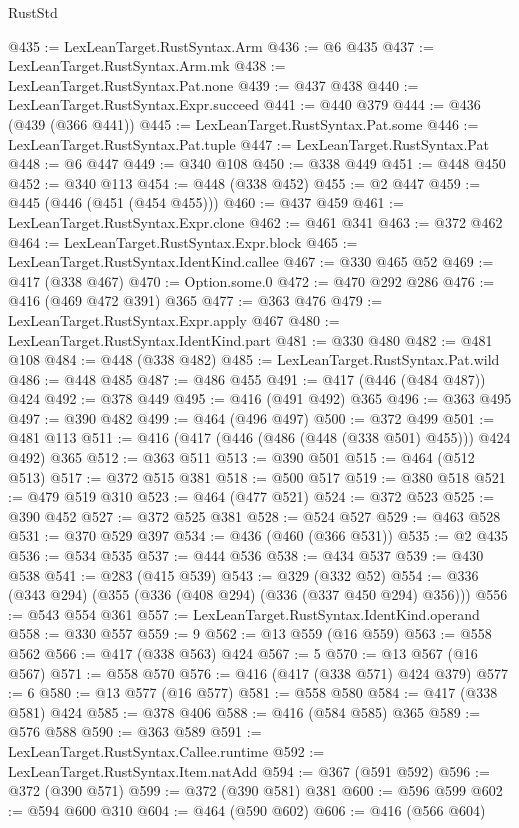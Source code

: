 \begin{lexlean}{RustStd}
\begin{coremodule}
@435 := LexLeanTarget.RustSyntax.Arm
@436 := @6 @435
@437 := LexLeanTarget.RustSyntax.Arm.mk
@438 := LexLeanTarget.RustSyntax.Pat.none
@439 := @437 @438
@440 := LexLeanTarget.RustSyntax.Expr.succeed
@441 := @440 @379
@444 := @436 (@439 (@366 @441))
@445 := LexLeanTarget.RustSyntax.Pat.some
@446 := LexLeanTarget.RustSyntax.Pat.tuple
@447 := LexLeanTarget.RustSyntax.Pat
@448 := @6 @447
@449 := @340 @108
@450 := @338 @449
@451 := @448 @450
@452 := @340 @113
@454 := @448 (@338 @452)
@455 := @2 @447
@459 := @445 (@446 (@451 (@454 @455)))
@460 := @437 @459
@461 := LexLeanTarget.RustSyntax.Expr.clone
@462 := @461 @341
@463 := @372 @462
@464 := LexLeanTarget.RustSyntax.Expr.block
@465 := LexLeanTarget.RustSyntax.IdentKind.callee
@467 := @330 @465 @52
@469 := @417 (@338 @467)
@470 := Option.some.{0}
@472 := @470 @292 @286
@476 := @416 (@469 @472 @391) @365
@477 := @363 @476
@479 := LexLeanTarget.RustSyntax.Expr.apply @467
@480 := LexLeanTarget.RustSyntax.IdentKind.part
@481 := @330 @480
@482 := @481 @108
@484 := @448 (@338 @482)
@485 := LexLeanTarget.RustSyntax.Pat.wild
@486 := @448 @485
@487 := @486 @455
@491 := @417 (@446 (@484 @487)) @424
@492 := @378 @449
@495 := @416 (@491 @492) @365
@496 := @363 @495
@497 := @390 @482
@499 := @464 (@496 @497)
@500 := @372 @499
@501 := @481 @113
@511 := @416 (@417 (@446 (@486 (@448 (@338 @501) @455))) @424 @492) @365
@512 := @363 @511
@513 := @390 @501
@515 := @464 (@512 @513)
@517 := @372 @515 @381
@518 := @500 @517
@519 := @380 @518
@521 := @479 @519 @310
@523 := @464 (@477 @521)
@524 := @372 @523
@525 := @390 @452
@527 := @372 @525 @381
@528 := @524 @527
@529 := @463 @528
@531 := @370 @529 @397
@534 := @436 (@460 (@366 @531))
@535 := @2 @435
@536 := @534 @535
@537 := @444 @536
@538 := @434 @537
@539 := @430 @538
@541 := @283 (@415 @539)
@543 := @329 (@332 @52)
@554 := @336 (@343 @294) (@355 (@336 (@408 @294) (@336 (@337 @450 @294) @356)))
@556 := @543 @554 @361
@557 := LexLeanTarget.RustSyntax.IdentKind.operand
@558 := @330 @557
@559 := 9
@562 := @13 @559 (@16 @559)
@563 := @558 @562
@566 := @417 (@338 @563) @424
@567 := 5
@570 := @13 @567 (@16 @567)
@571 := @558 @570
@576 := @416 (@417 (@338 @571) @424 @379)
@577 := 6
@580 := @13 @577 (@16 @577)
@581 := @558 @580
@584 := @417 (@338 @581) @424
@585 := @378 @406
@588 := @416 (@584 @585) @365
@589 := @576 @588
@590 := @363 @589
@591 := LexLeanTarget.RustSyntax.Callee.runtime
@592 := LexLeanTarget.RustSyntax.Item.natAdd
@594 := @367 (@591 @592)
@596 := @372 (@390 @571)
@599 := @372 (@390 @581) @381
@600 := @596 @599
@602 := @594 @600 @310
@604 := @464 (@590 @602)
@606 := @416 (@566 @604)

\end{coremodule}
\end{lexlean}
